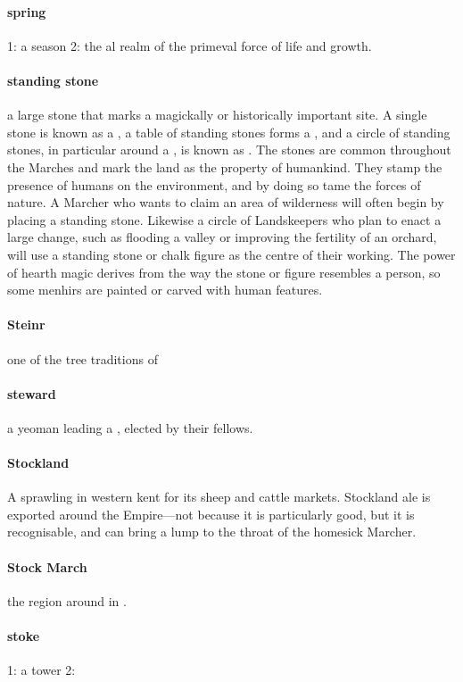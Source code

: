 \paragraph{spring} 1: a season 2: the al realm of the primeval force of life and growth.
\paragraph{standing stone} a large stone that marks a magickally or historically important site. A single stone is known as a , a table of standing stones forms a , and a circle of standing stones, in particular around a , is known as . The stones are common throughout the Marches and mark the land as the property of humankind. They stamp the presence of humans on the environment, and by doing so tame the forces of nature. A Marcher who wants to claim an area of wilderness will often begin by placing a standing stone. Likewise a circle of Landskeepers who plan to enact a large change, such as flooding a valley or improving the fertility of an orchard, will use a standing stone or chalk figure as the centre of their working. The power of hearth magic derives from the way the stone or figure resembles a person, so some menhirs are painted or carved with human features. 
\paragraph{Steinr} one of the tree traditions of 
\paragraph{steward} a yeoman leading a , elected by their fellows.
\paragraph{Stockland} A sprawling  in western  kent for its sheep and cattle markets. Stockland ale is exported around the Empire—not because it is particularly good, but it is recognisable, and can bring a lump to the throat of the homesick Marcher. 
\paragraph{Stock March} the region around  in .
\paragraph{stoke} 1: a tower 2: 
